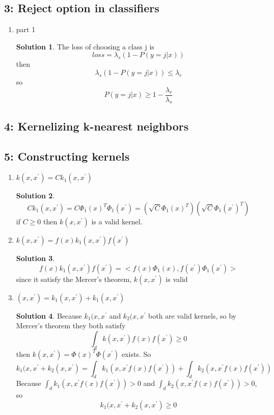 \documentclass[]{book}
\theoremstyle{definition}
\newtheorem*{soln}{Solution}
\begin{document}
\subsection*{3: Reject option in classifiers  }
\begin{enumerate}
	\item part 1
	\begin{soln}
		The loss of choosing a class j is 
		$$loss = \lambda_s (1 - P(y = j | x))$$
		then
		$$\lambda_s(1 - P(y = j | x))\leq \lambda_r$$
		so
		$$ P(y = j | x)\geq 1- \frac{\lambda_r}{\lambda_s}$$
	\end{soln}
\end{enumerate}
\subsection*{4: Kernelizing k-nearest neighbors  }
\subsection*{5: Constructing kernels  }
\begin{enumerate}
	\item $k(x,x^{'}) = C k_1(x,x^{'})$
	\begin{soln}
		$$C k_1(x,x^{'}) = C \Phi_1(x)^T \Phi_1(x^{'}) = (\sqrt{C}\Phi_1(x)^T)(\sqrt{C}\Phi_1(x^{'})^T)$$
		if $C\geq0$ then $k(x,x^{'})$ is a valid kernel.
	\end{soln}
	\item $k(x,x^{'}) = f(x) k_1(x,x^{'}) f(x^{'})$
	\begin{soln}
		$$f(x) k_1(x,x^{'})f(x^{'}) = <f(x)\Phi_1(x),  f(x^{'})\Phi_1(x^{'})>$$
		since it satisfy the Mercer's theorem, $k(x,x^{'})$ is valid
	\end{soln} 
	\item $(x,x^{'}) = k_1(x,x^{'}) + k_1(x,x^{'})$
	\begin{soln}
		Because $k_1(x,x^{'}$ and $k_2(x,x^{'}$ both are valid kernels, so by Mercer's theorem they both satisfy
		$$\int_d k(x,x^{'})f(x)f(x^{'})\geq0$$
		then $k(x,x^{'}) = \Phi(x)^T \Phi(x^{'})$ exists.
		So 
		$$k_1(x,x^{'} + k_2(x,x^{'}) = \int_d k_1(x,x^{'}f(x)f(x^{'})) + \int_d k_2(x,x^{'}f(x)f(x^{'}))$$
		Because $\int_d k_1(x,x^{'}f(x)f(x^{'})) > 0 $ and $\int_d k_2(x,x^{'}f(x)f(x^{'})) > 0 $, so
		$$k_1(x,x^{'} + k_2(x,x^{'}) \ge 0$$
	\end{soln}
\end{enumerate}
\end{document}

